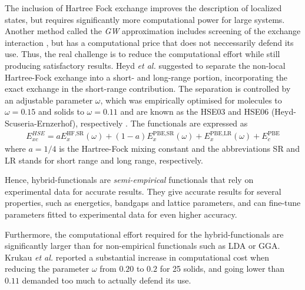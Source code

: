 The inclusion of Hartree Fock exchange improves the description of localized states, but requires significantly more computational power for large systems. Another method called the \textit{GW} approximation includes screening of the exchange interaction \cite{Aryasetiawan1998}, but has a computational price that does not neccessarily defend its use. Thus, the real challenge is to reduce the computational effort while still producing satisfactory results. Heyd \textit{et al.} \cite{Heyd2003} suggested to separate the non-local Hartree-Fock exchange into a short- and long-range portion, incorporating the exact exchange in the short-range contribution. The separation is controlled by an adjustable parameter $\omega$, which was empirically optimised for molecules to $\omega = 0.15$ and solids to $\omega = 0.11$ and are known as the HSE03 and HSE06 (Heyd-Scuseria-Ernzerhof), respectively \cite{Krukau2006}. The functionals are expressed as
\begin{align}
  E_{xc}^{HSE} = aE_{x}^{\text{HF,SR}}(\omega) + (1-a)E_x^{\text{PBE,SR}}(\omega) + E_x^{\text{PBE,LR}}(\omega) + E_c^{\text{PBE}}
\end{align}
where $a=1/4$ is the Hartree-Fock mixing constant and the abbreviations SR and LR stands for short range and long range, respectively.

Hence, hybrid-functionals are \textit{semi-empirical} functionals that rely on experimental data for accurate results. They give accurate results for several properties, such as energetics, bandgaps and lattice parameters, and can fine-tune parameters fitted to experimental data for even higher accuracy.

Furthermore, the computational effort required for the hybrid-functionals are significantly larger than for non-empirical functionals such as LDA or GGA. Krukau \textit{et al.} \cite{Krukau2006} reported a substantial increase in computational cost when reducing the parameter $\omega$ from $0.20$ to $0.2$ for 25 solids, and going lower than $0.11$ demanded too much  to actually defend its use.


